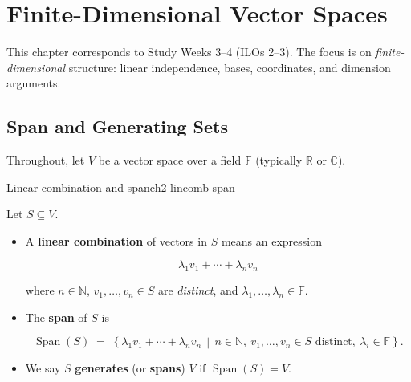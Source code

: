 

\section{Finite-Dimensional Vector Spaces}

\label{sec:finite-dimensional-vector-spaces}


This chapter corresponds to Study Weeks 3--4 (ILOs 2--3). The focus is on \emph{finite-dimensional} structure: linear independence, bases, coordinates, and dimension arguments.


\subsection{Span and Generating Sets}


Throughout, let $V$ be a vector space over a field $\mathbb{F}$ (typically $\mathbb{R}$ or $\mathbb{C}$).

\begin{definition}{Linear combination and span}{ch2-lincomb-span}

Let $S \subseteq V$.

\begin{itemize}

\item A \textbf{linear combination} of vectors in $S$ means an expression

\[
\lambda_1 v_1+\cdots+\lambda_n v_n
\]

where $n\in\mathbb{N}$, $v_1,\ldots,v_n\in S$ are \emph{distinct}, and $\lambda_1,\ldots,\lambda_n\in\mathbb{F}$.

\item The \textbf{span} of $S$ is

\[
\operatorname{Span}(S)\;=\;\left\{\lambda_1 v_1+\cdots+\lambda_n v_n \,\middle|\,
n\in\mathbb{N},\ v_1,\ldots,v_n\in S\text{ distinct},\ \lambda_i\in\mathbb{F}\right\}.
\]

\item We say $S$ \textbf{generates} (or \textbf{spans}) $V$ if $\operatorname{Span}(S)=V$.

\end{itemize}

\end{definition}

